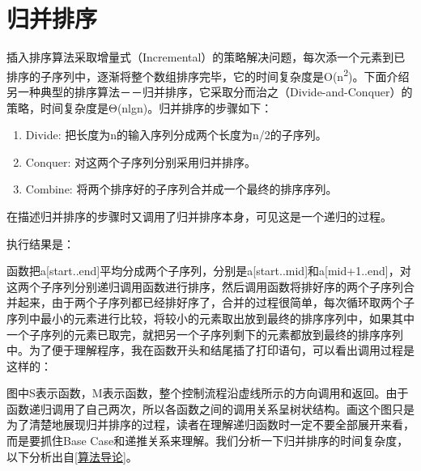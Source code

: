 
\section{归并排序}
%
插入排序算法采取增量式（Incremental）的策略解决问题，每次添一个元素到已排序的子序列中，逐渐将整个数组排序完毕，它的时间复杂度是O(n\textsuperscript{2})。下面介绍另一种典型的排序算法－－归并排序，它采取分而治之（Divide-and-Conquer）的策略，时间复杂度是Θ(nlgn)。归并排序的步骤如下：


\begin{enumerate}

\item Divide:\BookSplit{} 把长度为n的输入序列分成两个长度为n/\BookSplit{}2的子序列。

\item Conquer:\BookSplit{} 对这两个子序列分别采用归并排序。

\item Combine:\BookSplit{} 将两个排序好的子序列合并成一个最终的排序序列。
\end{enumerate}


在描述归并排序的步骤时又调用了归并排序本身，可见这是一个递归的过程。





执行结果是：




函数把a[start.\BookSplit{}.\BookSplit{}end]平均分成两个子序列，分别是a[start.\BookSplit{}.\BookSplit{}mid]和a[mid+\BookSplit{}1.\BookSplit{}.\BookSplit{}end]，对这两个子序列分别递归调用函数进行排序，然后调用函数将排好序的两个子序列合并起来，由于两个子序列都已经排好序了，合并的过程很简单，每次循环取两个子序列中最小的元素进行比较，将较小的元素取出放到最终的排序序列中，如果其中一个子序列的元素已取完，就把另一个子序列剩下的元素都放到最终的排序序列中。为了便于理解程序，我在函数开头和结尾插了打印语句，可以看出调用过程是这样的：




图中S表示函数，M表示函数，整个控制流程沿虚线所示的方向调用和返回。由于函数递归调用了自己两次，所以各函数之间的调用关系呈树状结构。画这个图只是为了清楚地展现归并排序的过程，读者在理解递归函数时一定不要全部展开来看，而是要抓住Base Case和递推关系来理解。我们分析一下归并排序的时间复杂度，以下分析出自\hyperlink{db.bi01.bibli.algorithm}{[算法导论]}。



